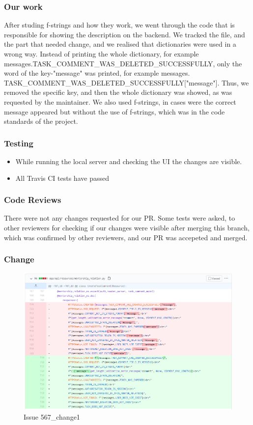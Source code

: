 \documentclass{article}
\begin{document}
\subsubsection{Our work}
After studing f-strings and how they work, we went through the code that is responsible for showing the description on the backend. We tracked the file, and the part that needed change, and we realised that dictionaries were used in a wrong way. Instead of printing the whole dictionary, for example messages.TASK\_COMMENT\_WAS\_DELETED\_SUCCESSFULLY, only the word of the key-"message" was printed, for example messages. \newline
TASK\_COMMENT\_WAS\_DELETED\_SUCCESSFULLY["message"]. Thus, we removed the specific key, and then the whole dictionary was showed, as was requested by the maintainer. We also used f-strings, in cases were the correct message appeared but without the use of f-strings, which was in the code standards of the project.
\subsubsection{Testing}
\begin{itemize}
\item While running the local server and checking the UI the changes are visible.
\item All Travis CI tests have passed
\end{itemize}
\subsubsection{Code Reviews}
There were not any changes requested for our PR. Some tests were asked, to other reviewers for checking if our changes were visible after merging this branch, which was confirmed by other reviewers, and our PR was accepeted and merged.
\subsubsection{Change}
\begin{figure}[tph!]
\centerline{\includegraphics[totalheight=14cm, width=16cm]{567Changes_1.png}}
    \caption{Issue 567\_change1}
    \label{fig:verticalcell}
\end{figure}
\end{document}
